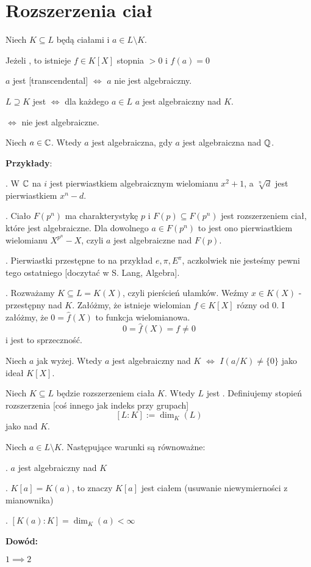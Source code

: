 \section{Rozszerzenia ciał}

\begin{definicja}
Niech $K\subseteq L$ będą ciałami i $a\in L\setminus K$.

\indent \point Jeżeli , to istnieje $f\in K[X]$ stopnia $>0$ i $f(a)=0$

\indent \point $a$ jest  [transcendental] $\iff$ $a$ nie jest algebraiczny.

\indent \point {} $L\supseteq K$ jest  $\iff$ dla każdego $a\in L$ $a$ jest algebraiczny nad $K$.

\indent \point {} $\iff$ nie jest algebraiczne.

\indent \point Niech $a\in \mathbb{C}$. Wtedy $a$ jest algebraiczna, gdy $a$ jest algebraiczna nad $\mathbb{Q}$.

\end{definicja}

\textbf{Przykłady}:

. W $\mathbb{C}$ na $i$ jest pierwiastkiem algebraicznym wielomianu $x^2+1$, a $\sqrt[n]{d}$ jest pierwiastkiem $x^n-d$. 

. Ciało $F(p^n)$ ma charakterystykę $p$ i $F(p)\subseteq F(p^n)$ jest rozszerzeniem ciał, które jest algebraiczne. Dla dowolnego $a\in F(p^n)$ to jest ono pierwiastkiem wielomianu $X^{p^n}-X$, czyli $a$ jest algebraiczne nad $F(p)$.

. Pierwiastki przestępne to na przykład $e,\pi,E^\pi$, aczkolwiek nie jesteśmy pewni tego ostatniego [doczytać w S. Lang, Algebra].

. Rozważamy $K\subseteq L=K(X)$, czyli pierścień ułamków. Weźmy $x\in K(X)$ - przestępny nad $K$. Załóżmy, że istnieje wielomian $f\in K[X]$ rózny od $0$. I załóżmy, że $0=\hat{f}(X)$ to funkcja wielomianowa. 
$$0=\hat{f}(X)=f\neq0$$
i jest to sprzeczność.


\begin{uwaga}
    Niech $a$ jak wyżej. Wtedy $a$ jest algebraiczny nad $K$ $\iff$ $I(a/K)\neq\{0\}$ jako ideał $K[X]$.
\end{uwaga}

Niech $K\subseteq L$ będzie rozszerzeniem ciała $K$. Wtedy $L$ jest . Definiujemy stopień rozszerzenia [coś innego jak indeks przy grupach]
$$[L:K]:=\dim_K(L)$$
jako  nad $K$.

\begin{uwaga}
    Niech $a\in L\setminus K$. Następujące warunki są równoważne:

. $a$ jest algebraiczny nad $K$

. $K[a]=K(a)$, to znaczy $K[a]$ jest ciałem (usuwanie niewymierności z mianownika)

. $[K(a):K]=\dim_K(a)<\infty$
\end{uwaga}

\textbf{Dowód:}

$1\implies2$

